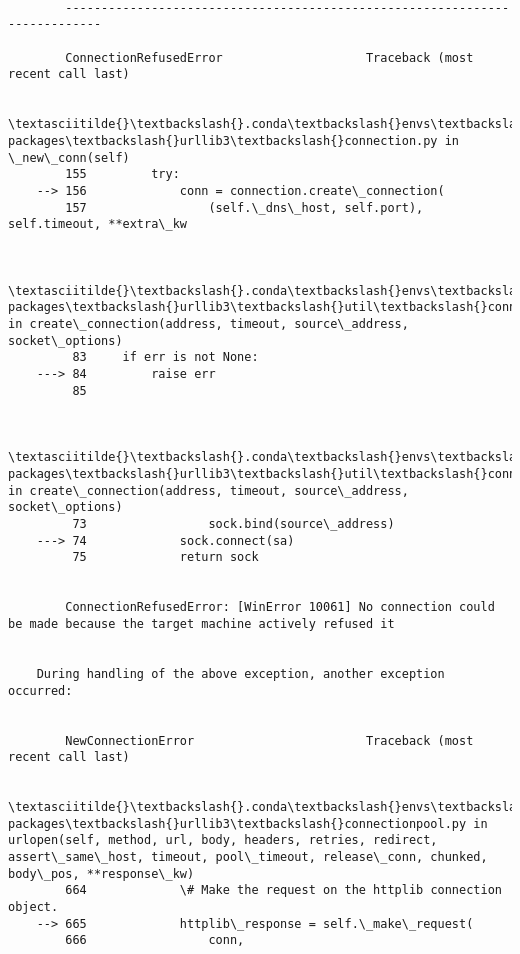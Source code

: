     \begin{Verbatim}[commandchars=\\\{\}]

        ---------------------------------------------------------------------------

        ConnectionRefusedError                    Traceback (most recent call last)

        \textasciitilde{}\textbackslash{}.conda\textbackslash{}envs\textbackslash{}SACCRconda\textbackslash{}lib\textbackslash{}site-packages\textbackslash{}urllib3\textbackslash{}connection.py in \_new\_conn(self)
        155         try:
    --> 156             conn = connection.create\_connection(
        157                 (self.\_dns\_host, self.port), self.timeout, **extra\_kw
    

        \textasciitilde{}\textbackslash{}.conda\textbackslash{}envs\textbackslash{}SACCRconda\textbackslash{}lib\textbackslash{}site-packages\textbackslash{}urllib3\textbackslash{}util\textbackslash{}connection.py in create\_connection(address, timeout, source\_address, socket\_options)
         83     if err is not None:
    ---> 84         raise err
         85 
    

        \textasciitilde{}\textbackslash{}.conda\textbackslash{}envs\textbackslash{}SACCRconda\textbackslash{}lib\textbackslash{}site-packages\textbackslash{}urllib3\textbackslash{}util\textbackslash{}connection.py in create\_connection(address, timeout, source\_address, socket\_options)
         73                 sock.bind(source\_address)
    ---> 74             sock.connect(sa)
         75             return sock
    

        ConnectionRefusedError: [WinError 10061] No connection could be made because the target machine actively refused it

        
    During handling of the above exception, another exception occurred:
    

        NewConnectionError                        Traceback (most recent call last)

        \textasciitilde{}\textbackslash{}.conda\textbackslash{}envs\textbackslash{}SACCRconda\textbackslash{}lib\textbackslash{}site-packages\textbackslash{}urllib3\textbackslash{}connectionpool.py in urlopen(self, method, url, body, headers, retries, redirect, assert\_same\_host, timeout, pool\_timeout, release\_conn, chunked, body\_pos, **response\_kw)
        664             \# Make the request on the httplib connection object.
    --> 665             httplib\_response = self.\_make\_request(
        666                 conn,
    


\end{Verbatim}
